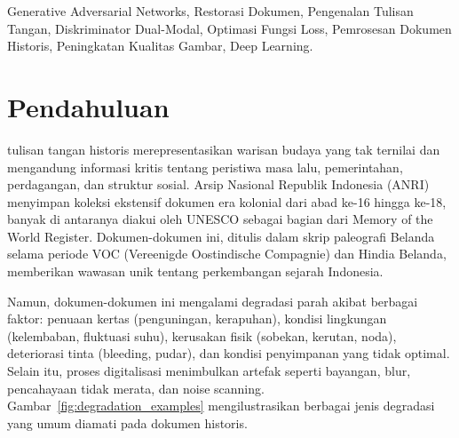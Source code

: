 \documentclass[journal]{IEEEtran}
\begin{document}
\begin{IEEEkeywords}
Generative Adversarial Networks, Restorasi Dokumen, Pengenalan Tulisan Tangan, Diskriminator Dual-Modal, Optimasi Fungsi Loss, Pemrosesan Dokumen Historis, Peningkatan Kualitas Gambar, Deep Learning.
\end{IEEEkeywords}






%
\IEEEpeerreviewmaketitle

\section{Pendahuluan}
 tulisan tangan historis merepresentasikan warisan budaya yang tak ternilai dan mengandung informasi kritis tentang peristiwa masa lalu, pemerintahan, perdagangan, dan struktur sosial. Arsip Nasional Republik Indonesia (ANRI) menyimpan koleksi ekstensif dokumen era kolonial dari abad ke-16 hingga ke-18, banyak di antaranya diakui oleh UNESCO sebagai bagian dari Memory of the World Register. Dokumen-dokumen ini, ditulis dalam skrip paleografi Belanda selama periode VOC (Vereenigde Oostindische Compagnie) dan Hindia Belanda, memberikan wawasan unik tentang perkembangan sejarah Indonesia.

Namun, dokumen-dokumen ini mengalami degradasi parah akibat berbagai faktor: penuaan kertas (penguningan, kerapuhan), kondisi lingkungan (kelembaban, fluktuasi suhu), kerusakan fisik (sobekan, kerutan, noda), deteriorasi tinta (bleeding, pudar), dan kondisi penyimpanan yang tidak optimal. Selain itu, proses digitalisasi menimbulkan artefak seperti bayangan, blur, pencahayaan tidak merata, dan noise scanning. Gambar~\ref{fig:degradation_examples} mengilustrasikan berbagai jenis degradasi yang umum diamati pada dokumen historis.

\end{document}

